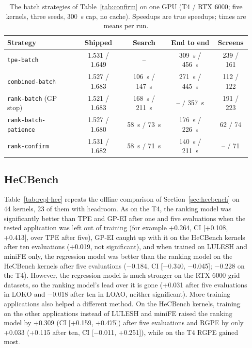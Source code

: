 \documentclass[10pt]{article}
\newcommand{\code}[1]{\texttt{#1}}
\begin{document}
\begin{table}[t]
\centering
\caption{The batch strategies of Table~\ref{tab:confirm} on one GPU (T4 / RTX
6000; five kernels, three seeds, 300~s cap, no cache). Speedups are true speedups;
times are means per run.}
\label{tab:repl-online}
\small
\setlength{\tabcolsep}{4pt}
\begin{tabular}{lcccc}
\toprule
Strategy & Shipped & Search & End to end & Screens \\
\midrule
\code{tpe-batch} & 1.531 / 1.649 & -- & 309~s / 456~s & 239 / 161 \\
\code{combined-batch} & 1.527 / 1.683 & 106~s / 147~s & 271~s / 445~s & 112 / 122 \\
\code{rank-batch} (GP stop) & 1.521 / 1.683 & 168~s / 211~s & -- / 357~s & 191 / 223 \\
\code{rank-batch-patience} & 1.527 / 1.680 & 58~s / 73~s & 176~s / 226~s & 62 / 74 \\
\code{rank-confirm} & 1.531 / 1.682 & 58~s / 71~s & 140~s / 211~s & -- / 71 \\
\bottomrule
\end{tabular}
\end{table}

\subsection{HeCBench}
Table~\ref{tab:repl-hec} repeats the offline comparison of
Section~\ref{sec:hecbench} on 44 kernels, 23 of them with headroom. As on the
T4, the ranking model was significantly better than TPE and GP-EI after one and
five evaluations when the tested application was left out of training (for
example +0.264, CI [+0.108, +0.413], over TPE after five), GP-EI caught up with
it on the HeCBench kernels after ten evaluations (+0.019, not significant),
and when trained on LULESH and miniFE only, the regression model was better
than the ranking model on the HeCBench kernels after five evaluations
($-$0.184, CI [$-$0.340, $-$0.045]; $-$0.228 on the T4). However, the regression
model is much stronger on the RTX 6000 grid datasets, so the ranking model's lead
over it is gone (+0.031 after five evaluations in LOKO and $-$0.018 after ten in
LOAO, neither significant). More training applications also helped a
different method. On the HeCBench kernels, training on the other applications
instead of LULESH and miniFE raised the ranking model by +0.309 (CI [+0.159,
+0.475]) after five evaluations and RGPE by only +0.033 (+0.115 after ten,
CI [$-$0.011, +0.251]), while on the T4 RGPE gained most.
\end{document}
